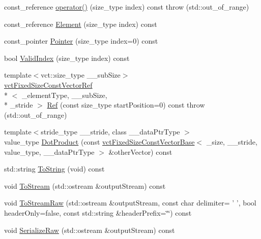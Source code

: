 \begin{DoxyCompactItemize}
\item 
const\-\_\-reference \hyperlink{classvct_fixed_size_const_vector_base_a7e21b648dfa6753525587c1b5b45d16e}{operator()} (size\-\_\-type index) const   throw (std\-::out\-\_\-of\-\_\-range)
\item 
const\-\_\-reference \hyperlink{classvct_fixed_size_const_vector_base_a74c07af6ecdfcd5b83eb7c1296d05daa}{Element} (size\-\_\-type index) const 
\item 
const\-\_\-pointer \hyperlink{classvct_fixed_size_const_vector_base_a86ebcd642499eea0d64454a5ac944fcd}{Pointer} (size\-\_\-type index=0) const 
\item 
bool \hyperlink{classvct_fixed_size_const_vector_base_a4a1e8dbbfb96f4da5392d5bac6574f2a}{Valid\-Index} (size\-\_\-type index) const 
\item 
{\footnotesize template$<$vct\-::size\-\_\-type \-\_\-\-\_\-sub\-Size$>$ }\\\hyperlink{classvct_fixed_size_const_vector_ref}{vct\-Fixed\-Size\-Const\-Vector\-Ref}\\*
$<$ \-\_\-element\-Type, \-\_\-\-\_\-sub\-Size, \\*
\-\_\-stride $>$ \hyperlink{classvct_fixed_size_const_vector_base_acda2461f4b4517a87031e029df0c420c}{Ref} (const size\-\_\-type start\-Position=0) const   throw (std\-::out\-\_\-of\-\_\-range)
\item 
{\footnotesize template$<$stride\-\_\-type \-\_\-\-\_\-stride, class \-\_\-\-\_\-data\-Ptr\-Type $>$ }\\value\-\_\-type \hyperlink{classvct_fixed_size_const_vector_base_ad33a3f89474cac17f0f917a0725106da}{Dot\-Product} (const \hyperlink{classvct_fixed_size_const_vector_base}{vct\-Fixed\-Size\-Const\-Vector\-Base}$<$ \-\_\-size, \-\_\-\-\_\-stride, value\-\_\-type, \-\_\-\-\_\-data\-Ptr\-Type $>$ \&other\-Vector) const 
\item 
std\-::string \hyperlink{classvct_fixed_size_const_vector_base_ab28c36ca88b582037a197d5b37fb6a20}{To\-String} (void) const 
\item 
void \hyperlink{classvct_fixed_size_const_vector_base_abec81757524558b2c393646313f31163}{To\-Stream} (std\-::ostream \&output\-Stream) const 
\item 
void \hyperlink{classvct_fixed_size_const_vector_base_aa413d5dd8a954fe8e36b21299f5181aa}{To\-Stream\-Raw} (std\-::ostream \&output\-Stream, const char delimiter= ' ', bool header\-Only=false, const std\-::string \&header\-Prefix=\char`\"{}\char`\"{}) const 
\item 
void \hyperlink{classvct_fixed_size_const_vector_base_a3b7b8125332df76aec10b7053339e691}{Serialize\-Raw} (std\-::ostream \&output\-Stream) const 
\end{DoxyCompactItemize}

